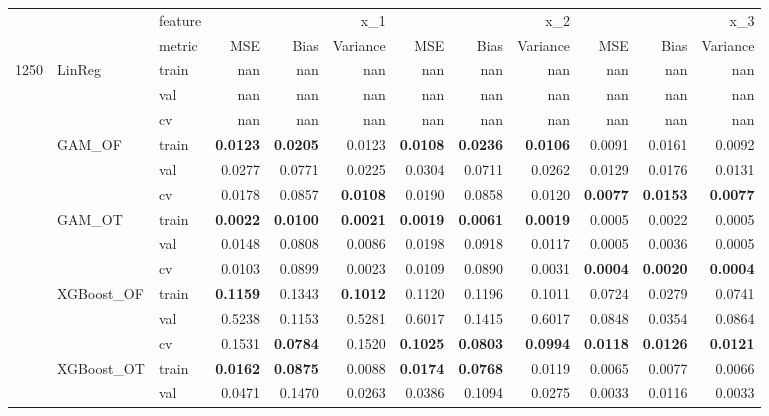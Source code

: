 \begin{tabular}{lllrrrrrrrrr}
 &  & feature & \multicolumn{3}{r}{x_1} & \multicolumn{3}{r}{x_2} & \multicolumn{3}{r}{x_3} \\
 &  & metric & MSE & Bias & Variance & MSE & Bias & Variance & MSE & Bias & Variance \\
\multirow[c]{15}{*}{1250} & \multirow[c]{3}{*}{LinReg} & train & nan & nan & nan & nan & nan & nan & nan & nan & nan \\
 &  & val & nan & nan & nan & nan & nan & nan & nan & nan & nan \\
 &  & cv & nan & nan & nan & nan & nan & nan & nan & nan & nan \\
 & \multirow[c]{3}{*}{GAM_OF} & train & \bfseries 0.0123 & \bfseries 0.0205 & 0.0123 & \bfseries 0.0108 & \bfseries 0.0236 & \bfseries 0.0106 & 0.0091 & 0.0161 & 0.0092 \\
 &  & val & 0.0277 & 0.0771 & 0.0225 & 0.0304 & 0.0711 & 0.0262 & 0.0129 & 0.0176 & 0.0131 \\
 &  & cv & 0.0178 & 0.0857 & \bfseries 0.0108 & 0.0190 & 0.0858 & 0.0120 & \bfseries 0.0077 & \bfseries 0.0153 & \bfseries 0.0077 \\
 & \multirow[c]{3}{*}{GAM_OT} & train & \bfseries 0.0022 & \bfseries 0.0100 & \bfseries 0.0021 & \bfseries 0.0019 & \bfseries 0.0061 & \bfseries 0.0019 & 0.0005 & 0.0022 & 0.0005 \\
 &  & val & 0.0148 & 0.0808 & 0.0086 & 0.0198 & 0.0918 & 0.0117 & 0.0005 & 0.0036 & 0.0005 \\
 &  & cv & 0.0103 & 0.0899 & 0.0023 & 0.0109 & 0.0890 & 0.0031 & \bfseries 0.0004 & \bfseries 0.0020 & \bfseries 0.0004 \\
 & \multirow[c]{3}{*}{XGBoost_OF} & train & \bfseries 0.1159 & 0.1343 & \bfseries 0.1012 & 0.1120 & 0.1196 & 0.1011 & 0.0724 & 0.0279 & 0.0741 \\
 &  & val & 0.5238 & 0.1153 & 0.5281 & 0.6017 & 0.1415 & 0.6017 & 0.0848 & 0.0354 & 0.0864 \\
 &  & cv & 0.1531 & \bfseries 0.0784 & 0.1520 & \bfseries 0.1025 & \bfseries 0.0803 & \bfseries 0.0994 & \bfseries 0.0118 & \bfseries 0.0126 & \bfseries 0.0121 \\
 & \multirow[c]{3}{*}{XGBoost_OT} & train & \bfseries 0.0162 & \bfseries 0.0875 & 0.0088 & \bfseries 0.0174 & \bfseries 0.0768 & 0.0119 & 0.0065 & 0.0077 & 0.0066 \\
 &  & val & 0.0471 & 0.1470 & 0.0263 & 0.0386 & 0.1094 & 0.0275 & 0.0033 & 0.0116 & 0.0033 \\

\end{tabular}
